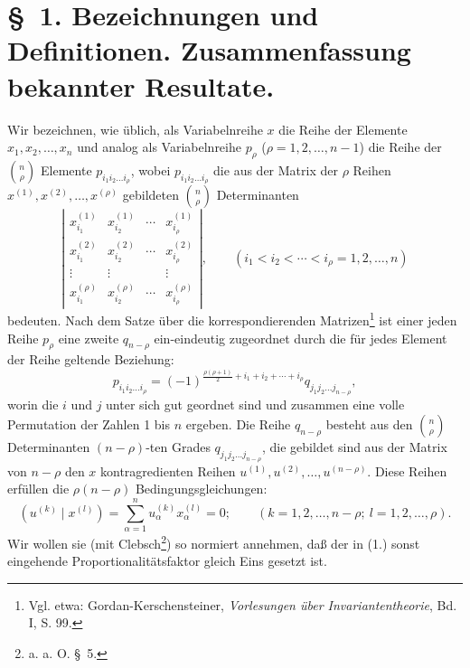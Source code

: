 \documentclass[11pt]{article}
\begin{document}
\section*{\S\ 1. Bezeichnungen und Definitionen. Zusammenfassung bekannter Resultate.}
Wir bezeichnen, wie üblich, als Variabelnreihe $x$ die Reihe der Elemente $x_1,x_2,\ldots,x_n$ und analog als Variabelnreihe $p_\rho$ ($\rho=1,2,\ldots,n-1$) die Reihe der $\binom n\rho$ Elemente $p_{i_1i_2\ldots i_\rho}$, wobei $p_{i_1i_2\ldots i_\rho}$ die aus der Matrix der $\rho$ Reihen $x^{(1)},x^{(2)},\ldots,x^{(\rho)}$ gebildeten $\binom n\rho$ Determinanten
\[
\left|\begin{array}{cccc}
 x_{i_1}^{(1)}&x_{i_2}^{(1)}&\cdots&x_{i_\rho}^{(1)}\\
 x_{i_1}^{(2)}&x_{i_2}^{(2)}&\cdots&x_{i_\rho}^{(2)}\\
 \vdots&\vdots&&\vdots\\
 x_{i_1}^{(\rho)}&x_{i_2}^{(\rho)}&\cdots&x_{i_\rho}^{(\rho)}
\end{array}\right|,
\qquad (i_1<i_2<\cdots<i_\rho=1,2,\ldots,n)
\]
bedeuten. Nach dem Satze über die korrespondierenden Matrizen\footnote{Vgl. etwa: Gordan-Kerschensteiner, \emph{Vorlesungen über Invariantentheorie}, Bd. I, S. 99.} ist einer jeden Reihe $p_\rho$ eine zweite $q_{n-\rho}$ ein-eindeutig zugeordnet durch die für jedes Element der Reihe geltende Beziehung:
\begin{equation}
 p_{i_1i_2\ldots i_\rho}=(-1)^{\frac{\rho(\rho+1)}{2}+i_1+i_2+\cdots+i_\rho}q_{j_1j_2\ldots j_{n-\rho}},
\tag{1}
\end{equation}
worin die $i$ und $j$ unter sich gut geordnet sind und zusammen eine volle Permutation der Zahlen 1 bis $n$ ergeben. Die Reihe $q_{n-\rho}$ besteht aus den $\binom n\rho$ Determinanten $(n-\rho)$-ten Grades $q_{j_1j_2\ldots j_{n-\rho}}$, die gebildet sind aus der Matrix von $n-\rho$ den $x$ kontragredienten Reihen $u^{(1)},u^{(2)},\ldots,u^{(n-\rho)}$. Diese Reihen erfüllen die $\rho(n-\rho)$ Bedingungsgleichungen:
\begin{equation}
 (u^{(k)}\mid x^{(l)})=\sum_{\alpha=1}^{n}u_\alpha^{(k)}x_\alpha^{(l)}=0;
 \qquad (k=1,2,\ldots,n-\rho;\ l=1,2,\ldots,\rho).
\tag{2}
\end{equation}
Wir wollen sie (mit Clebsch\footnote{a. a. O. \S\ 5.}) so normiert annehmen, daß der in (1.) sonst eingehende Proportionalitätsfaktor gleich Eins gesetzt ist.
\end{document}

